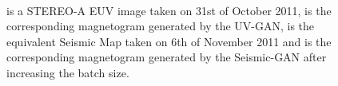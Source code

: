 \documentclass[11pt,a4paper,onecolumn]{report}
\begin{document}
\begin{figure}[t]%
  \centering
  \\
  \caption[]{ is a STEREO-A EUV image taken on 31st of October 2011,
   is the corresponding magnetogram generated by
  the UV-GAN,  is the equivalent Seismic Map taken
  on 6th of November 2011 and
   is the corresponding magnetogram generated by the
  Seismic-GAN after increasing the batch size.}
  \label{fig:batch}
\end{figure}
\end{document}
